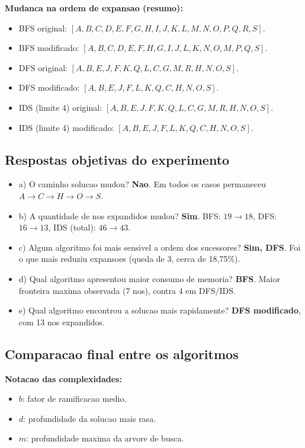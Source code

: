 \textbf{Mudanca na ordem de expansao (resumo):}
\begin{itemize}[leftmargin=1.5em]
  \item BFS original: $[A,B,C,D,E,F,G,H,I,J,K,L,M,N,O,P,Q,R,S]$.
  \item BFS modificado: $[A,B,C,D,E,F,H,G,I,J,L,K,N,O,M,P,Q,S]$.
  \item DFS original: $[A,B,E,J,F,K,Q,L,C,G,M,R,H,N,O,S]$.
  \item DFS modificado: $[A,B,E,J,F,L,K,Q,C,H,N,O,S]$.
  \item IDS (limite 4) original: $[A,B,E,J,F,K,Q,L,C,G,M,R,H,N,O,S]$.
  \item IDS (limite 4) modificado: $[A,B,E,J,F,L,K,Q,C,H,N,O,S]$.
\end{itemize}

\subsection{Respostas objetivas do experimento}
\begin{itemize}[leftmargin=1.5em]
  \item a) O caminho solucao mudou? \textbf{Nao}. Em todos os casos permaneceu $A \rightarrow C \rightarrow H \rightarrow O \rightarrow S$.
  \item b) A quantidade de nos expandidos mudou? \textbf{Sim}. BFS: $19 \rightarrow 18$, DFS: $16 \rightarrow 13$, IDS (total): $46 \rightarrow 43$.
  \item c) Algum algoritmo foi mais sensivel a ordem dos sucessores? \textbf{Sim, DFS}. Foi o que mais reduziu expansoes (queda de 3, cerca de 18,75\%).
  \item d) Qual algoritmo apresentou maior consumo de memoria? \textbf{BFS}. Maior fronteira maxima observada ($7$ nos), contra $4$ em DFS/IDS.
  \item e) Qual algoritmo encontrou a solucao mais rapidamente? \textbf{DFS modificado}, com 13 nos expandidos.
\end{itemize}

\subsection{Comparacao final entre os algoritmos}
\textbf{Notacao das complexidades:}
\begin{itemize}[leftmargin=1.5em]
  \item $b$: fator de ramificacao medio.
  \item $d$: profundidade da solucao mais rasa.
  \item $m$: profundidade maxima da arvore de busca.
\end{itemize}


